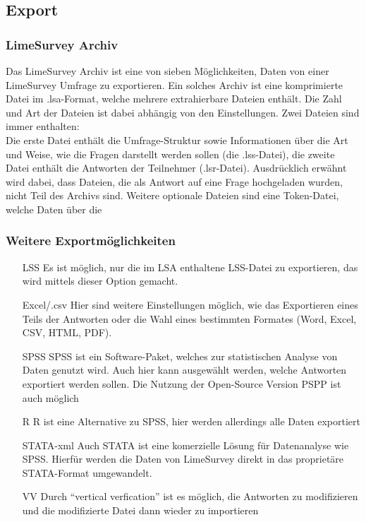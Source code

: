 \subsection{Export}
\subsubsection{LimeSurvey Archiv}
\label{m:lsa}
Das LimeSurvey Archiv ist eine von sieben Möglichkeiten, Daten von einer LimeSurvey Umfrage zu exportieren.
Ein solches Archiv ist eine komprimierte Datei im .lsa-Format, welche mehrere extrahierbare Dateien enthält.
Die Zahl und Art der Dateien ist dabei abhängig von den Einstellungen. Zwei Dateien sind immer enthalten:\\
Die erste Datei enthält die Umfrage-Struktur sowie Informationen über die Art und Weise, wie die Fragen darstellt werden sollen (die .lss-Datei), die zweite Datei enthält die Antworten der Teilnehmer (.lsr-Datei).
Ausdrücklich erwähnt wird dabei, dass Dateien, die als Antwort auf eine Frage hochgeladen wurden, nicht Teil des Archivs sind.
Weitere optionale Dateien sind eine Token-Datei, welche Daten über die %

\subsubsection{Weitere Exportmöglichkeiten}
\begin{itemize}
	\item[LSS] Es ist möglich, nur die im LSA enthaltene LSS-Datei zu exportieren, das wird mittels dieser Option gemacht.
	\item[Excel/.csv] Hier sind weitere Einstellungen möglich, wie das Exportieren eines Teils der Antworten oder die Wahl eines bestimmten Formates (Word, Excel, CSV, HTML, PDF).
	\item[SPSS] SPSS ist ein Software-Paket, welches zur statistischen Analyse von Daten genutzt wird. Auch hier kann ausgewählt werden, welche Antworten exportiert werden sollen. Die Nutzung der Open-Source Version PSPP ist auch möglich
	\item[R] R ist eine Alternative zu SPSS, hier werden allerdings alle Daten exportiert
	\item[STATA-xml] Auch STATA ist eine komerzielle Lösung für Datenanalyse wie SPSS. Hierfür werden die Daten von LimeSurvey direkt in das proprietäre STATA-Format umgewandelt.
	\item[VV] Durch \enquote{vertical verfication} ist es möglich, die Antworten zu modifizieren und die modifizierte Datei dann wieder zu importieren
\end{itemize}

